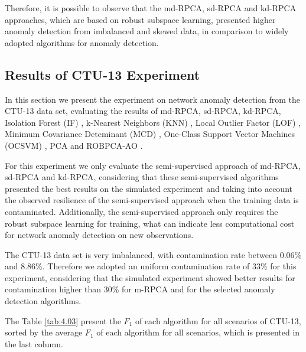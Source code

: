 \documentclass[review]{elsarticle}
\begin{document}
Therefore, it is possible to observe that the md-RPCA, sd-RPCA and kd-RPCA approaches, which are based on robust subspace learning, presented higher anomaly detection from imbalanced and skewed data, in comparison to widely adopted algorithms for anomaly detection. 

\subsection{Results of CTU-13 Experiment}
\label{sec:3_ctu13_result}

In this section we present the experiment on network anomaly detection from the CTU-13 data set, evaluating the results of md-RPCA, sd-RPCA, kd-RPCA, Isolation Forest (IF) \cite{liu2008isolation}, k-Nearest Neighbors (KNN) \cite{angiulli2002fast}, Local Outlier Factor (LOF) \cite{breunig2000lof}, Minimum Covariance Deteminant (MCD) \cite{rousseeuw1999fastmcd}, One-Class Support Vector Machines (OCSVM) \cite{scholkopf2001estimating}, PCA \cite{shyu2003novel} and ROBPCA-AO \cite{hubert2009robustskewed}.

For this experiment we only evaluate the semi-supervised approach of md-RPCA, sd-RPCA and kd-RPCA, considering that these semi-supervised algorithms presented the best results on the simulated experiment and taking into account the observed resilience of the semi-supervised approach when the training data is contaminated. Additionally, the semi-supervised approach only requires the robust subspace learning for training, what can indicate less computational cost for network anomaly detection on new observations.

The CTU-13 data set is very imbalanced, with contamination rate between 0.06\% and 8.86\%. Therefore we adopted an uniform contamination rate of 33\% for this experiment, considering that the simulated experiment showed better results for contamination higher than 30\% for m-RPCA and for the selected anomaly detection algorithms.

The Table \ref{tab:4.03} present the $F_1$ of each algorithm for all scenarios of CTU-13, sorted by the average $F_1$ of each algorithm for all scenarios, which is presented in the last column.
\end{document}
